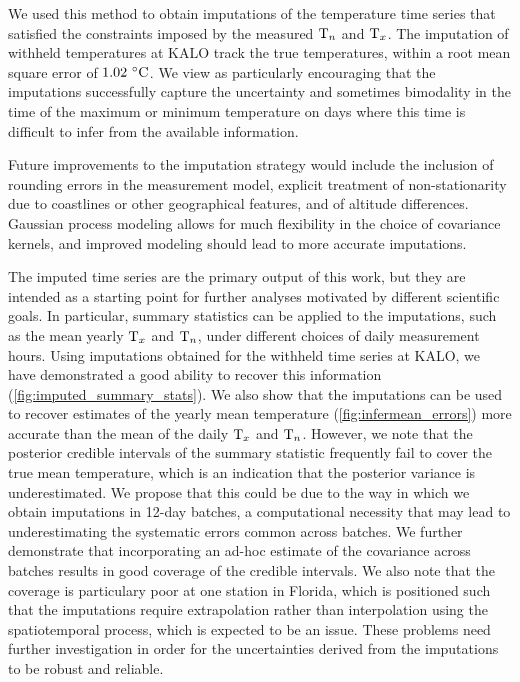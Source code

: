 We used this method to obtain imputations of the temperature time series that satisfied the constraints imposed by the measured \(\mathrm{T}_{n}\) and \(\mathrm{T}_{x}\).
The imputation of withheld temperatures at KALO track the true temperatures, within a root mean square error of \(1.02\,{\,^\circ}{}\mathrm{C}\).
We view as particularly encouraging that the imputations successfully capture the uncertainty and sometimes bimodality in the time of the maximum or minimum temperature on days where this time is difficult to infer from the available information.

Future improvements to the imputation strategy would include the inclusion of rounding errors in the measurement model, explicit treatment of non-stationarity due to coastlines or other geographical features, and of altitude differences.
Gaussian process modeling allows for much flexibility in the choice of covariance kernels, and improved modeling should lead to more accurate imputations.

The imputed time series are the primary output of this work, but they are intended as a starting point for further analyses motivated by different scientific goals.
In particular, summary statistics can be applied to the imputations, such as the mean yearly \(\mathrm{T}_{x}\) and \(\mathrm{T}_{n}\), under different choices of daily measurement hours.
Using imputations obtained for the withheld time series at KALO, we have demonstrated a good ability to recover this information (\autoref{fig:imputed_summary_stats}).
We also show that the imputations can be used to recover estimates of the yearly mean temperature (\autoref{fig:infermean_errors})
more accurate than the mean of the daily \(\mathrm{T}_{x}\) and \(\mathrm{T}_{n}\).
However, we note that the posterior credible intervals of the summary statistic frequently fail to cover the true mean temperature,
which is an indication that the posterior variance is underestimated.
We propose that this could be due to the way in which we obtain imputations in 12-day batches, a computational necessity
that may lead to underestimating the systematic errors common across batches.
We further demonstrate that incorporating an ad-hoc estimate of the covariance across batches results in good coverage of the credible intervals.
We also note that the coverage is particulary poor at one station in Florida, which is positioned such that the imputations require extrapolation
rather than interpolation using the spatiotemporal process, which is expected to be an issue.
These problems need further investigation in order for the uncertainties derived from the imputations to be robust and reliable.

